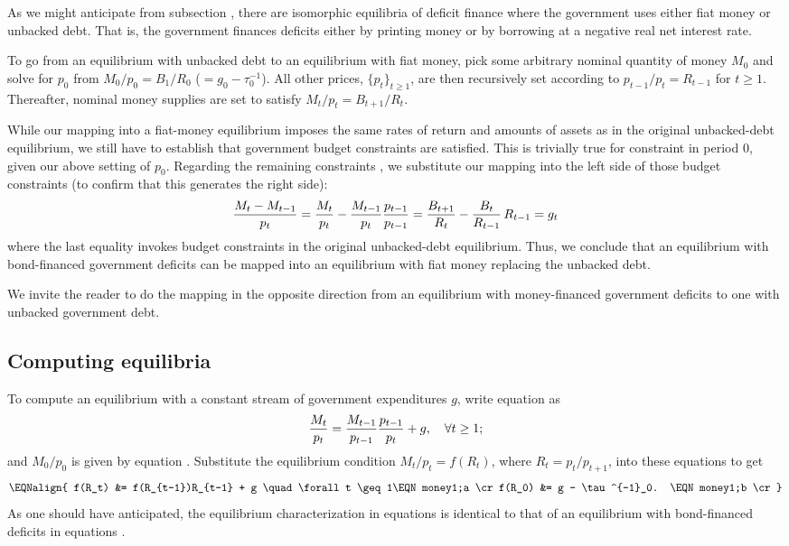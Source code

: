 As we might anticipate from subsection , there
are isomorphic equilibria of deficit finance where the 
government uses either fiat money or unbacked debt. That is, 
the government finances deficits either by printing money or by
borrowing at a negative real net interest rate. 

To go from an equilibrium with unbacked debt to an equilibrium 
with fiat money, pick some arbitrary nominal quantity of 
money $M_0$ and solve for $p_0$ from $M_0/p_0=B_1/R_0$ ($= g_0-\tau^{-1}_0$). 
All other prices, $\{p_t\}_{t\geq 1}$, are then recursively set
according to $p_{t-1}/p_t=R_{t-1}$ for $t\geq 1$. Thereafter,
nominal money supplies are set to satisfy 
$M_t / p_t = B_{t+1} / R_t$.

While our mapping into a fiat-money equilibrium imposes the same 
rates of return and amounts of assets as in the original 
unbacked-debt equilibrium, we still have to establish that
government budget constraints  are satisfied. 
This is trivially true for constraint  in 
period $0$, given our above setting of $p_0$. Regarding the 
remaining constraints , we substitute our 
mapping into the left side of those budget constraints
(to confirm that this generates the right side):
$${M_t - M_{t-1} \over p_t} = {M_t \over p_t} 
                            - {M_{t-1} \over p_t} {p_{t-1} \over p_{t-1}}
                            = {B_{t+1} \over R_t} 
                            - {B_t \over R_{t-1}}\,R_{t-1} 
                            = g_t 
$$
where the last equality invokes budget constraints 
 in the original unbacked-debt equilibrium.
Thus, we conclude that an equilibrium with bond-financed
government deficits can be mapped into an equilibrium with
fiat money replacing the unbacked debt. 

We invite the
reader to do the mapping in the opposite direction
from an equilibrium with money-financed government
deficits to one with unbacked government debt.


\subsection{Computing equilibria}

To compute an equilibrium with a constant stream of
government expenditures $g$, write equation  as
$$ {M_t \over  p_t} = {M_{t-1} \over p_{t-1} }  {p_{t-1} \over p_t}
     + g,  \quad \forall t \geq 1;$$
and ${M_0 / p_0}$ is given by equation .
Substitute the equilibrium condition $M_t / p_t = f(R_t)$, where
$R_t=p_t/p_{t+1}$, into these equations to
get
$$\EQNalign{ f(R_t) &= f(R_{t-1})R_{t-1} + g  \quad 
                             \forall t \geq 1\EQN money1;a \cr
             f(R_0) &=  g - \tau^{-1}_0. \EQN money1;b \cr}
$$
As one should have anticipated, the equilibrium characterization
in equations  is identical
to that of an equilibrium with bond-financed deficits
in equations .


